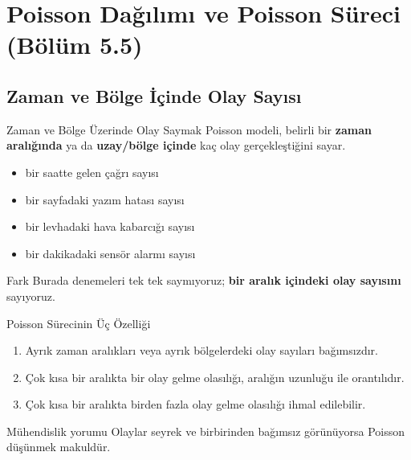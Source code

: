 \documentclass[light]{lutbeamer}
\begin{document}
\section{Poisson Dağılımı ve Poisson Süreci (Bölüm 5.5)}
\subsection{Zaman ve Bölge İçinde Olay Sayısı}

\begin{frame}{Zaman ve Bölge Üzerinde Olay Saymak}
    \small
    Poisson modeli, belirli bir \textbf{zaman aralığında} ya da \textbf{uzay/bölge içinde} kaç olay gerçekleştiğini sayar.

    \begin{itemize}
        \item bir saatte gelen çağrı sayısı
        \item bir sayfadaki yazım hatası sayısı
        \item bir levhadaki hava kabarcığı sayısı
        \item bir dakikadaki sensör alarmı sayısı
    \end{itemize}

    \begin{alertblock}{Fark}
        Burada denemeleri tek tek saymıyoruz; \textbf{bir aralık içindeki olay sayısını} sayıyoruz.
    \end{alertblock}
\end{frame}

\begin{frame}{Poisson Sürecinin Üç Özelliği}
    \small
    \begin{enumerate}
        \item Ayrık zaman aralıkları veya ayrık bölgelerdeki olay sayıları bağımsızdır.
        \item Çok kısa bir aralıkta bir olay gelme olasılığı, aralığın uzunluğu ile orantılıdır.
        \item Çok kısa bir aralıkta birden fazla olay gelme olasılığı ihmal edilebilir.
    \end{enumerate}

    \begin{block}{Mühendislik yorumu}
        Olaylar seyrek ve birbirinden bağımsız görünüyorsa Poisson düşünmek makuldür.
    \end{block}
\end{frame}
\end{document}
